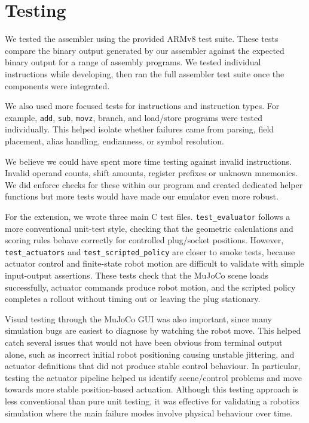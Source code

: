 \documentclass[11pt]{article}
\begin{document}
\section{Testing}

We tested the assembler using the provided ARMv8 test suite. These tests compare the binary output generated by our assembler against the expected binary output for a range of assembly programs. We tested individual instructions while developing, then ran the full assembler test suite once the components were integrated.

We also used more focused tests for instructions and instruction types. For example, \texttt{add}, \texttt{sub}, \texttt{movz}, branch, and load/store programs were tested individually. This helped isolate whether failures came from parsing, field placement, alias handling, endianness, or symbol resolution.

We believe we could have spent more time testing against invalid instructions. Invalid operand counts, shift amounts, register prefixes or unknown mnemonics. We did enforce checks for these within our program and created dedicated helper functions but more tests would have made our emulator even more robust.

For the extension, we wrote three main C test files. \texttt{test\_evaluator} follows a more conventional unit-test style, checking that the geometric calculations and scoring rules behave correctly for controlled plug/socket positions. However, \texttt{test\_actuators} and \texttt{test\_scripted\_policy} are closer to smoke tests, because actuator control and finite-state robot motion are difficult to validate with simple input-output assertions. These tests check that the MuJoCo scene loads successfully, actuator commands produce robot motion, and the scripted policy completes a rollout without timing out or leaving the plug stationary.

Visual testing through the MuJoCo GUI was also important, since many simulation bugs are easiest to diagnose by watching the robot move. This helped catch several issues that would not have been obvious from terminal output alone, such as incorrect initial robot positioning causing unstable jittering, and actuator definitions that did not produce stable control behaviour. In particular, testing the actuator pipeline helped us identify scene/control problems and move towards more stable position-based actuation. Although this testing approach is less conventional than pure unit testing, it was effective for validating a robotics simulation where the main failure modes involve physical behaviour over time.
\end{document}
